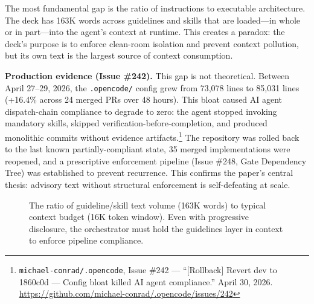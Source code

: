 \documentclass[11pt,a4paper]{article}
\begin{document}
The most fundamental gap is the ratio of instructions to executable architecture.  The deck has 163K words across guidelines and skills that are loaded---in whole or in part---into the agent's context at runtime.  This creates a paradox: the deck's purpose is to enforce clean-room isolation and prevent context pollution, but its own text is the largest source of context consumption.

\begin{insightbox}
\textbf{Production evidence (Issue \#242).}  This gap is not theoretical.  Between April 27--29, 2026, the \texttt{.opencode/} config grew from 73,078 lines to 85,031 lines (+16.4\% across 24 merged PRs over 48 hours).  This bloat caused AI agent dispatch-chain compliance to degrade to zero: the agent stopped invoking mandatory skills, skipped verification-before-completion, and produced monolithic commits without evidence artifacts.\footnote{\texttt{michael-conrad/.opencode}, Issue \#242 --- ``[Rollback] Revert dev to 1860c0d --- Config bloat killed AI agent compliance.''  April 30, 2026.  \url{https://github.com/michael-conrad/.opencode/issues/242}}  The repository was rolled back to the last known partially-compliant state, 35 merged implementations were reopened, and a prescriptive enforcement pipeline (Issue \#248, Gate Dependency Tree) was established to prevent recurrence.  This confirms the paper's central thesis: advisory text without structural enforcement is self-defeating at scale.
\end{insightbox}

\begin{figure}[htbp]
\centering
{}
\caption{The ratio of guideline/skill text volume (163K words) to typical context budget (16K token window).  Even with progressive disclosure, the orchestrator must hold the guidelines layer in context to enforce pipeline compliance.}
\label{fig:bloat}
\end{figure}
\end{document}
